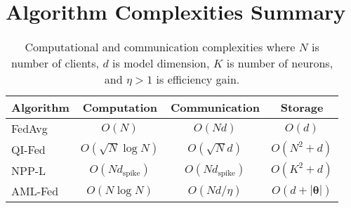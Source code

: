 \documentclass[12pt,a4paper]{article}
\begin{document}
\section{Algorithm Complexities Summary}

\begin{table}[h]
\centering
\begin{tabular}{|l|c|c|c|}
\hline
\textbf{Algorithm} & \textbf{Computation} & \textbf{Communication} & \textbf{Storage} \\
\hline
FedAvg & $O(N)$ & $O(Nd)$ & $O(d)$ \\
QI-Fed & $O(\sqrt{N} \log N)$ & $O(\sqrt{N}d)$ & $O(N^2 + d)$ \\
NPP-L & $O(N d_{\text{spike}})$ & $O(N d_{\text{spike}})$ & $O(K^2 + d)$ \\
AML-Fed & $O(N \log N)$ & $O(Nd/\eta)$ & $O(d + |\bm{\theta}|)$ \\
\hline
\end{tabular}
\caption{Computational and communication complexities where $N$ is number of clients, $d$ is model dimension, $K$ is number of neurons, and $\eta > 1$ is efficiency gain.}
\end{table}
\end{document}
